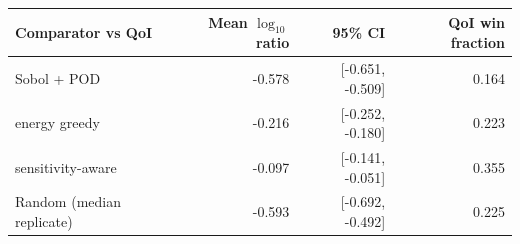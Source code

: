 \begin{tabular}{lrrr}
\toprule
Comparator vs QoI & Mean $\log_{10}$ ratio & 95\% CI & QoI win fraction \\
\midrule
Sobol + POD & -0.578 & [-0.651, -0.509] & 0.164 \\
energy greedy & -0.216 & [-0.252, -0.180] & 0.223 \\
sensitivity-aware & -0.097 & [-0.141, -0.051] & 0.355 \\
Random (median replicate) & -0.593 & [-0.692, -0.492] & 0.225 \\
\bottomrule
\end{tabular}
